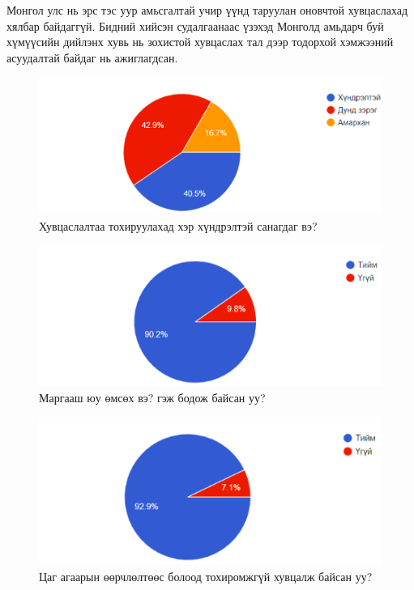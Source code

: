 \par Монгол улс нь   эрс тэс уур амьсгалтай учир үүнд таруулан оновчтой хувцаслахад хялбар байдаггүй. Бидний хийсэн судалгаанаас үзэхэд Монголд амьдарч буй хүмүүсийн дийлэнх хувь нь зохистой хувцаслах тал дээр тодорхой хэмжээний асуудалтай байдаг нь ажиглагдсан.
\begin{figure}[H]
    \centering
    \caption{Хувцаслалтаа тохируулахад хэр хүндрэлтэй санагдаг вэ? \cite{grap1}}
    \includegraphics[width=\textwidth]{figures/Screenshot 2024-10-03 at 15.59.07.png}
    
    \label{fig:sudalgaa1}
\end{figure}
\begin{figure}[H]
    \centering
    \caption{Маргааш юу өмсөх вэ? гэж бодож байсан уу? \cite{grap2}}
    \includegraphics[width=\textwidth]{figures/Screenshot 2024-10-03 at 16.17.44.png}
    
    \label{fig:sudalgaa}
\end{figure}
\begin{figure}[H]
    \centering
    \caption{Цаг агаарын өөрчлөлтөөс болоод тохиромжгүй хувцалж байсан уу? \cite{grap3}}
    \includegraphics[width=\textwidth]{figures/Screenshot 2024-10-03 at 17.19.53.png}
    
    \label{fig:sudalgaa}
\end{figure}



